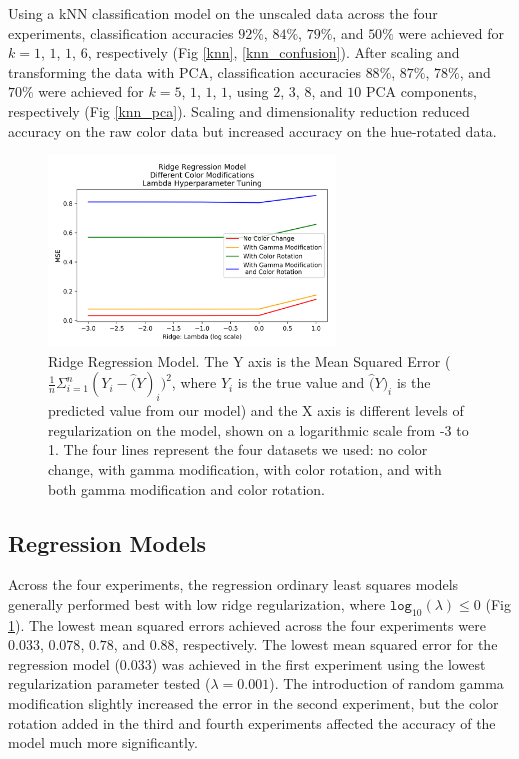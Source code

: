 \documentclass[journal]{IEEEtran}
\begin{document}
Using a kNN classification model on the unscaled data across the four experiments, classification accuracies $92\%$, $84\%$, $79\%$, and $50\%$ were achieved for $k=1$, $1$, $1$, $6$, respectively (Fig \ref{knn}, \ref{knn_confusion}). After scaling and transforming the data with PCA, classification accuracies $88\%$, $87\%$, $78\%$, and $70\%$ were achieved for $k=5$, $1$, $1$, $1$, using $2$, $3$, $8$, and $10$ PCA components, respectively (Fig \ref{knn_pca}). Scaling and dimensionality reduction reduced accuracy on the raw color data but increased accuracy on the hue-rotated data.

\begin{figure}
\centering
\includegraphics[height=2in]{Ridge/ridge_regression3.png}
\caption{Ridge Regression Model. The Y axis is the Mean Squared Error ($\frac{1}{n} \Sigma_{i=1}^n (Y_i - \hat(Y)_i)^2$, where $Y_i$ is the true value and $\hat(Y)_i$ is the predicted value from our model) and the X axis is different levels of regularization on the model, shown on a logarithmic scale from -3 to 1. The four lines represent the four datasets we used: no color change, with gamma modification, with color rotation, and with both gamma modification and color rotation.}
\label{ridge}
\end{figure}

\subsection{Regression Models}

Across the four experiments, the regression ordinary least squares models generally performed best with low ridge regularization, where $\texttt{log}_{10}(\lambda) \leq 0$  (Fig \ref{ridge}). The lowest mean squared errors achieved across the four experiments were $0.033$, $0.078$, $0.78$, and $0.88$, respectively. The lowest mean squared error for the regression model ($0.033$) was achieved in the first experiment using the lowest regularization parameter tested ($\lambda = 0.001$). The introduction of random gamma modification slightly increased the error in the second experiment, but the color rotation added in the third and fourth experiments affected the accuracy of the model much more significantly.
\end{document}
